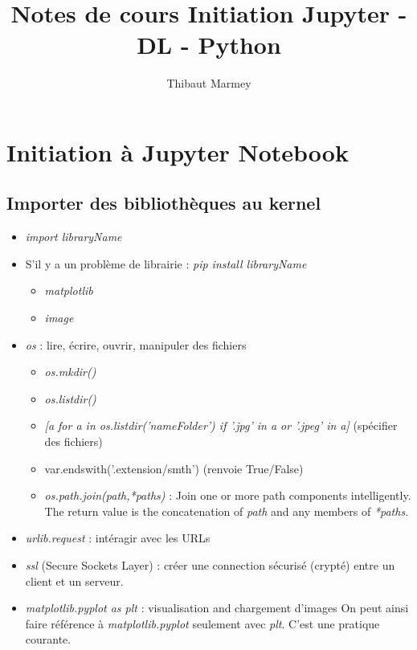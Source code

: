 \documentclass[12pt,a4paper]{article}
\author{Thibaut Marmey}
\title{Notes de cours Initiation Jupyter - DL - Python}
\begin{document}
	\maketitle

\begin{normalsize}
\tableofcontents
\end{normalsize}

\section{Initiation à Jupyter Notebook}

\subsection{Importer des bibliothèques au kernel}
\begin{itemize}
\item \textit{import libraryName}
\item S'il y a un problème de librairie : \textit{pip install libraryName}
\begin{itemize}
\item \textit{matplotlib}
\item \textit{image}
\end{itemize}
\item \textit{os} : lire, écrire, ouvrir, manipuler des fichiers
\begin{itemize}
\item \textit{os.mkdir()}
\item \textit{os.listdir()}
\item \textit{[a for a in os.listdir('nameFolder') if '.jpg' in a or '.jpeg' in a]} (spécifier des fichiers)
\item var.endswith('.extension/smth') (renvoie True/False)
\item \textit{os.path.join(path,*paths)} : Join one or more path components intelligently. The return value is the concatenation of \textit{path} and any members of \textit{*paths}.
\end{itemize}
\item \textit{urlib.request} : intéragir avec les URLs
\item \textit{ssl} (Secure Sockets Layer) : créer une connection sécurisé (crypté) entre un client et un serveur.
\item \textit{matplotlib.pyplot as plt} : visualisation and chargement d'images
\newline On peut ainsi faire référence à \textit{matplotlib.pyplot} seulement avec \textit{plt}. C'est une pratique courante.

\end{itemize}
\end{document}

